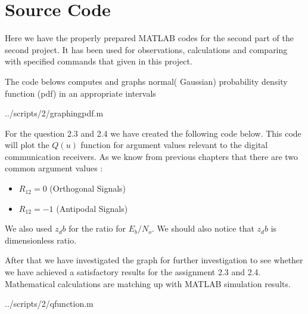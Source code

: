 \section{Source Code}
Here we have the properly prepared MATLAB codes for the second part of the second project. It has been used for observations, calculations and comparing with specified commands that given in this project.

The code belows computes and graphs normal( Gaussian) probability density function (pdf) in an appropriate intervals

\begin{lstinputlisting}[language=Octave]{../scripts/2/graphingpdf.m}
\end{lstinputlisting}


For the question 2.3 and 2.4 we have created the following code below. This code will plot the $Q(u)$ function for argument values relevant to the digital communication receivers. As we know from previous chapters that there are two common argument values :
\begin{itemize}
	\item $R_12=0 $ (Orthogonal Signals) 
	\item $R_12=-1$ (Antipodal Signals)
\end{itemize}
We also used $z_db$ for the ratio for $E_b/N_o$. We should also notice that $z_db$ is dimensionless ratio.

After that we have investigated the graph for further investigation to see whether we have achieved a satisfactory results for the assignment 2.3 and 2.4. Mathematical calculations are matching up with MATLAB simulation results.

\begin{lstinputlisting}[language=Octave]{../scripts/2/qfunction.m}
\end{lstinputlisting}
